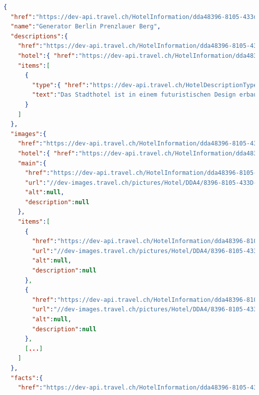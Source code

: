 \begin{lstlisting}[language=json,firstnumber=1]
{
  "href":"https://dev-api.travel.ch/HotelInformation/dda48396-8105-433d-b75b-668f96ec89d8",
  "name":"Generator Berlin Prenzlauer Berg",
  "descriptions":{
    "href":"https://dev-api.travel.ch/HotelInformation/dda48396-8105-433d-b75b-668f96ec89d8/Descriptions",
    "hotel":{ "href":"https://dev-api.travel.ch/HotelInformation/dda48396-8105-433d-b75b-668f96ec89d8" },
    "items":[
      {
        "type":{ "href":"https://dev-api.travel.ch/HotelDescriptionType/Hotel" },
        "text":"Das Stadthotel ist in einem futuristischen Design erbaut und befindet sich in der Naehe der Berlin Arena und der S-Bahnstation Landsberger Allee, nur sechs Strassenbahnhaltestellen vom Alexanderplatz entfernt. Das stilvolle Hostel verfuegt ueber farbenfrohe Zimmer mit Schliessfach und eigenem Bad bzw. Gemeinschaftsbad und die Bar organisiert taegliche Veranstaltungen und woechentliche Partys. Darueber hinaus werden Karaoke-Abende, Filmvorfuehrungen und kostenlose Wanderungen angeboten. Dieses Hostel verspricht einen einzigartigen und unvergesslichen Aufenthalt."
      }
    ]
  },
  "images":{
    "href":"https://dev-api.travel.ch/HotelInformation/dda48396-8105-433d-b75b-668f96ec89d8/ImageGallery",
    "hotel":{ "href":"https://dev-api.travel.ch/HotelInformation/dda48396-8105-433d-b75b-668f96ec89d8" },
    "main":{
      "href":"https://dev-api.travel.ch/HotelInformation/dda48396-8105-433d-b75b-668f96ec89d8/Image/SG90ZWxcRERBNFw4Mzk2LTgxMDUtNDMzRC1CNzVCLTY2OEY5NkVDODlEOFwwMTU5NzVhX2hiX2JhXzAxMi5qcGc=",
      "url":"//dev-images.travel.ch/pictures/Hotel/DDA4/8396-8105-433D-B75B-668F96EC89D8/015975a_hb_ba_012.jpg",
      "alt":null,
      "description":null
    },
    "items":[
      {
        "href":"https://dev-api.travel.ch/HotelInformation/dda48396-8105-433d-b75b-668f96ec89d8/Image/SG90ZWxcRERBNFw4Mzk2LTgxMDUtNDMzRC1CNzVCLTY2OEY5NkVDODlEOFwwMTU5NzVhX2hiX2JhXzAxMi5qcGc=",
        "url":"//dev-images.travel.ch/pictures/Hotel/DDA4/8396-8105-433D-B75B-668F96EC89D8/015975a_hb_ba_012.jpg",
        "alt":null,
        "description":null
      },
      {
        "href":"https://dev-api.travel.ch/HotelInformation/dda48396-8105-433d-b75b-668f96ec89d8/Image/SG90ZWxcRERBNFw4Mzk2LTgxMDUtNDMzRC1CNzVCLTY2OEY5NkVDODlEOFwwMTU5NzVhX2hiX2xfMDA5LmpwZw==",
        "url":"//dev-images.travel.ch/pictures/Hotel/DDA4/8396-8105-433D-B75B-668F96EC89D8/015975a_hb_l_009.jpg",
        "alt":null,
        "description":null
      },
      [...]
    ]
  },
  "facts":{
    "href":"https://dev-api.travel.ch/HotelInformation/dda48396-8105-433d-b75b-668f96ec89d8/Facts",

\end{lstlisting}
